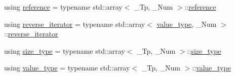 \begin{DoxyCompactItemize}
\item 
using \hyperlink{class____gnu__cxx_1_1__StaticPolynomial_a280562caf2d2f392b5b73cac1e64e8ed}{reference} = typename std\+::array$<$ \+\_\+\+Tp, \+\_\+\+Num $>$\+::\hyperlink{class____gnu__cxx_1_1__StaticPolynomial_a280562caf2d2f392b5b73cac1e64e8ed}{reference}
\item 
using \hyperlink{class____gnu__cxx_1_1__StaticPolynomial_ab6a9fab0cd102db2a5bfd00fe9f35e4d}{reverse\+\_\+iterator} = typename std\+::array$<$ \hyperlink{class____gnu__cxx_1_1__StaticPolynomial_af23110f5a002cd6caa3542df7cf35284}{value\+\_\+type}, \+\_\+\+Num $>$\+::\hyperlink{class____gnu__cxx_1_1__StaticPolynomial_ab6a9fab0cd102db2a5bfd00fe9f35e4d}{reverse\+\_\+iterator}
\item 
using \hyperlink{class____gnu__cxx_1_1__StaticPolynomial_a3384ce6a956ad398fc995e6ee53b2b18}{size\+\_\+type} = typename std\+::array$<$ \+\_\+\+Tp, \+\_\+\+Num $>$\+::\hyperlink{class____gnu__cxx_1_1__StaticPolynomial_a3384ce6a956ad398fc995e6ee53b2b18}{size\+\_\+type}
\item 
using \hyperlink{class____gnu__cxx_1_1__StaticPolynomial_af23110f5a002cd6caa3542df7cf35284}{value\+\_\+type} = typename std\+::array$<$ \+\_\+\+Tp, \+\_\+\+Num $>$\+::\hyperlink{class____gnu__cxx_1_1__StaticPolynomial_af23110f5a002cd6caa3542df7cf35284}{value\+\_\+type}
\end{DoxyCompactItemize}
